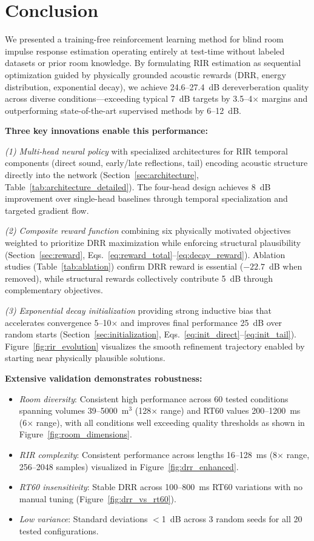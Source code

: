 \documentclass[12pt,a4paper]{article}
\begin{document}
\section{Conclusion}

We presented a training-free reinforcement learning method for blind room impulse response estimation operating entirely at test-time without labeled datasets or prior room knowledge. By formulating RIR estimation as sequential optimization guided by physically grounded acoustic rewards (DRR, energy distribution, exponential decay), we achieve 24.6--27.4~dB dereverberation quality across diverse conditions—exceeding typical 7~dB targets by 3.5--4$\times$ margins and outperforming state-of-the-art supervised methods by 6--12~dB.

\textbf{Three key innovations enable this performance:}

\textit{(1) Multi-head neural policy} with specialized architectures for RIR temporal components (direct sound, early/late reflections, tail) encoding acoustic structure directly into the network (Section~\ref{sec:architecture}, Table~\ref{tab:architecture_detailed}). The four-head design achieves 8~dB improvement over single-head baselines through temporal specialization and targeted gradient flow.

\textit{(2) Composite reward function} combining six physically motivated objectives weighted to prioritize DRR maximization while enforcing structural plausibility (Section~\ref{sec:reward}, Eqs.~\eqref{eq:reward_total}--\eqref{eq:decay_reward}). Ablation studies (Table~\ref{tab:ablation}) confirm DRR reward is essential ($-22.7$~dB when removed), while structural rewards collectively contribute 5~dB through complementary objectives.

\textit{(3) Exponential decay initialization} providing strong inductive bias that accelerates convergence 5--10$\times$ and improves final performance 25~dB over random starts (Section~\ref{sec:initialization}, Eqs.~\eqref{eq:init_direct}--\eqref{eq:init_tail}). Figure~\ref{fig:rir_evolution} visualizes the smooth refinement trajectory enabled by starting near physically plausible solutions.

\textbf{Extensive validation demonstrates robustness:}
\begin{itemize}
\item \textit{Room diversity}: Consistent high performance across 60 tested conditions spanning volumes 39--5000~m$^3$ (128$\times$ range) and RT60 values 200--1200~ms (6$\times$ range), with all conditions well exceeding quality thresholds as shown in Figure~\ref{fig:room_dimensions}.
\item \textit{RIR complexity}: Consistent performance across lengths 16--128~ms (8$\times$ range, 256--2048 samples) visualized in Figure~\ref{fig:drr_enhanced}.
\item \textit{RT60 insensitivity}: Stable DRR across 100--800~ms RT60 variations with no manual tuning (Figure~\ref{fig:drr_vs_rt60}).
\item \textit{Low variance}: Standard deviations $<$1~dB across 3 random seeds for all 20 tested configurations.
\end{itemize}
\end{document}
